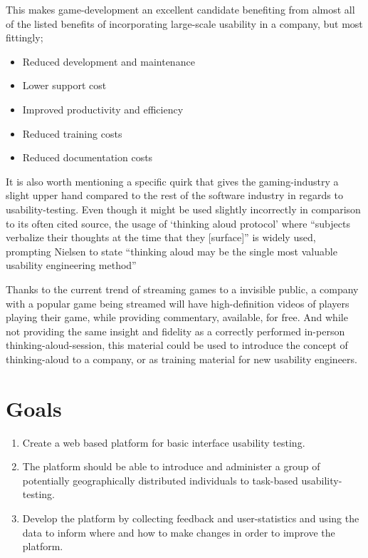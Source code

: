   This makes game-development an excellent candidate benefiting from almost all
  of the listed benefits of incorporating large-scale usability in a company,
  but most fittingly;
  \begin{itemize}
    \item{Reduced development and maintenance}
    \item{Lower support cost}
    \item{Improved productivity and efficiency}
    \item{Reduced training costs}
    \item{Reduced documentation costs}
  \end{itemize}

  It is also worth mentioning a specific quirk that gives the gaming-industry a
  slight upper hand compared to the rest of the software industry in regards to
  usability-testing. Even though it might be used slightly
  incorrectly\cite{citeThinkAloud} in comparison to its often cited
  source\cite{ProtocolanalysisVerbalReportsAsData}, the usage of `thinking
  aloud protocol' where ``subjects verbalize their thoughts at the time that
  they [surface]''\cite[p. 60]{ProtocolanalysisVerbalReportsAsData} is widely
  used, prompting Nielsen to state ``thinking aloud may be the single most
  valuable usability engineering method''\cite[p. 195]{citeHeuristicsNielsenUsabilityEngineering}

  Thanks to the current trend of streaming games to a invisible public, a
  company with a popular game being streamed will have high-definition videos
  of players playing their game, while providing commentary, available, for
  free. And while not providing the same insight and fidelity as a correctly
  performed in-person thinking-aloud-session, this material could be used to
  introduce the concept of thinking-aloud to a company, or as training
  material for new usability
  engineers\cite{citeYouTubeGamersandThinkAloudProtocolsIntroducingUsabilityTesting}.

\section{Goals}

  \begin{enumerate}
    \item{
      Create a web based platform for basic interface usability testing.
    }
    \item {
      The platform should be able to introduce and administer a group of
      potentially geographically distributed individuals to task-based
      usability-testing.
    }
    \item{
      Develop the platform by collecting feedback and user-statistics and using
      the data to inform where and how to make changes in order to improve the
      platform.
    }
  \end{enumerate}
